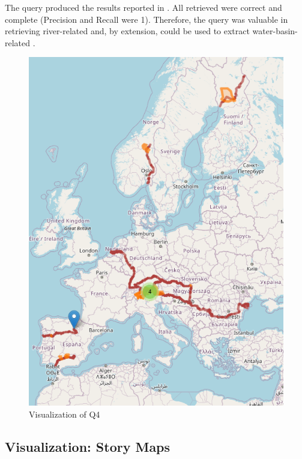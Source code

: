 The query produced the results reported in . All  retrieved were correct and complete (Precision and Recall were 1). Therefore, the query was valuable in retrieving river-related  and, by extension, could be used to extract water-basin-related .

\begin{figure}[h!tb]
    \centerline {\includegraphics[scale=0.6]{img/rivers.png}}
    \caption{Visualization of Q4}
    \label{fig:rivers}
\end{figure}


\subsection{Visualization: Story Maps}\label{VII-subsec:moving-visualization}


